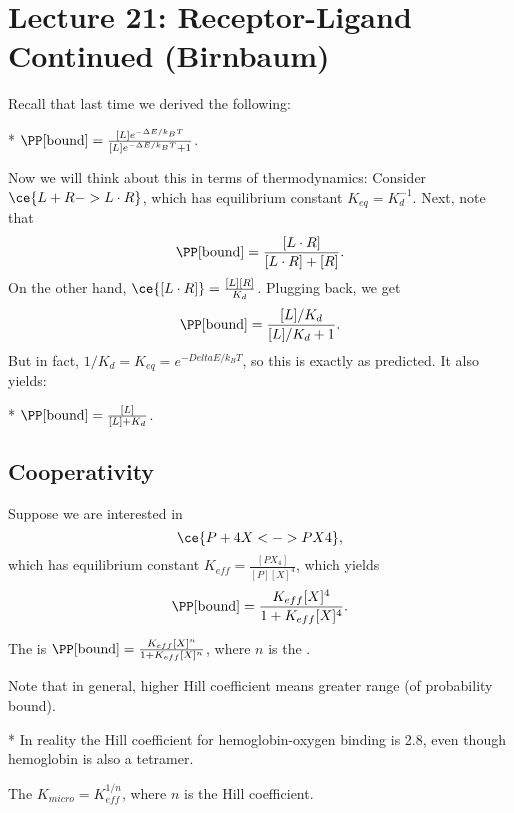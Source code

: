 \section*{Lecture 21: Receptor-Ligand Continued (Birnbaum)}
\setcounter{section}{21}

Recall that last time we derived the following:

\begin{fact}*
	$\PP[\text{bound}] = \frac{[L]e^{-\Delta E/k_BT}}{[L]e^{-\Delta E/k_BT} + 1}$.
\end{fact}

Now we will think about this in terms of thermodynamics: Consider $\ce{L + R -> L\cdot R}$, which has equilibrium constant $K_{eq} = K_d^{-1}$.
Next, note that \[
	\PP[\text{bound}] = \frac{[L\cdot R]}{[L\cdot R]+[R]}.
\]
On the other hand, $\ce{[L\cdot R]} = \frac{[L][R]}{K_d}$. Plugging back, we get \[
	\PP[\text{bound}] = \frac{[L]/K_d}{[L]/K_d+1}.
\]
But in fact, $1/K_d = K_{eq} = e^{-Delta E/k_BT}$, so this is exactly as predicted.
It also yields:

\begin{fact}*
	$\PP[\text{bound}] = \frac{[L]}{[L] + K_d}$.
\end{fact}

\subsection{Cooperativity}

Suppose we are interested in \[
	\ce{P + 4X <-> PX4},
\]
which has equilibrium constant $K_{eff} = \frac{[PX_4]}{[P][X]^4}$, which yields \[
	\PP[\text{bound}] = \frac{K_{eff} [X]^4}{1 + K_{eff} [X]^4}.
\]
\begin{defn}
	The  is $\PP[\text{bound}] = \frac{K_{eff}[X]^n}{1 + K_{eff}[X]^n}$, where $n$ is the .
\end{defn}

Note that in general, higher Hill coefficient means greater range (of probability bound).
\begin{fact}*
	In reality the Hill coefficient for hemoglobin-oxygen binding is 2.8, even though hemoglobin is also a tetramer.
\end{fact}

\begin{defn}
	The  $K_{micro} = K_{eff}^{1/n}$, where $n$ is the Hill coefficient.
\end{defn}

